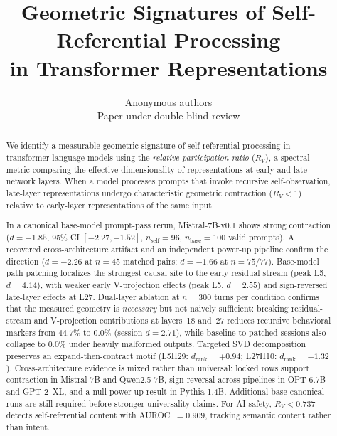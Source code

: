\documentclass{article}
\title{Geometric Signatures of Self-Referential Processing\\
       in Transformer Representations}
\author{Anonymous authors\\Paper under double-blind review}
\newcommand{\RV}{R_V}
\newcommand{\dcohen}{d}
\begin{document}
\ifcolmsubmission
\linenumbers
\fi

\maketitle

\begin{abstract}
We identify a measurable geometric signature of self-referential processing in transformer language
models using the \emph{relative participation ratio} ($\RV$), a spectral metric comparing the
effective dimensionality of representations at early and late network layers.
When a model processes prompts that invoke recursive self-observation, late-layer representations
undergo characteristic geometric contraction ($\RV < 1$) relative to early-layer representations
of the same input.

In a canonical base-model prompt-pass rerun, Mistral-7B-v0.1 shows strong contraction
($\dcohen = -1.85$, 95\% CI $[-2.27, -1.52]$, $n_\mathrm{self}=96$, $n_\mathrm{base}=100$ valid prompts).
A recovered cross-architecture artifact and an independent power-up pipeline confirm the direction
($\dcohen = -2.26$ at $n = 45$ matched pairs; $\dcohen = -1.66$ at $n = 75/77$).
Base-model path patching localizes the strongest causal site to the early residual stream
(peak L5, $\dcohen = 4.14$), with weaker early V-projection effects
(peak L5, $\dcohen = 2.55$) and sign-reversed late-layer effects at L27.
Dual-layer ablation at $n{=}300$ turns per condition confirms that the measured geometry is
\emph{necessary} but not naively sufficient: breaking residual-stream and V-projection contributions
at layers~18 and~27 reduces recursive behavioral markers from $44.7\%$ to $0.0\%$
(session $\dcohen = 2.71$), while baseline-to-patched sessions also collapse to $0.0\%$
under heavily malformed outputs.
Targeted SVD decomposition preserves an expand-then-contract motif
(L5H29: $\dcohen_{\mathrm{rank}} = +0.94$; L27H10: $\dcohen_{\mathrm{rank}} = -1.32$).
Cross-architecture evidence is mixed rather than universal: locked rows support contraction in
Mistral-7B and Qwen2.5-7B, sign reversal across pipelines in OPT-6.7B and GPT-2~XL, and a null
power-up result in Pythia-1.4B.
Additional base canonical runs are still required before stronger universality claims.
For AI safety, $\RV < 0.737$ detects self-referential content with AUROC~$= 0.909$,
tracking semantic content rather than intent.
\end{abstract}
\end{document}
